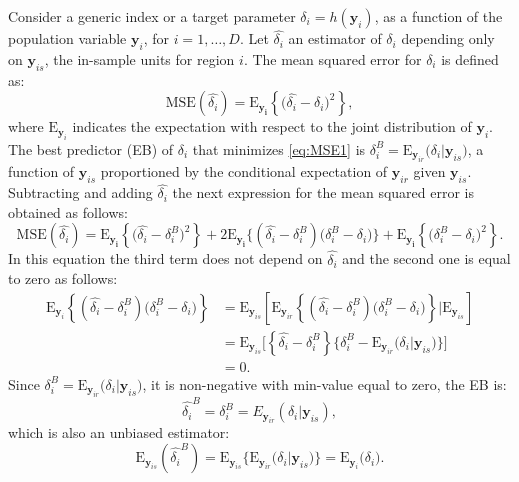 \documentclass[a4paper, 11pt]{article}
\begin{document}
Consider a generic index or a target parameter $\delta_i=h(\mathbf{y}_i)$, as a function of the population variable $\mathbf{y}_i$, for $i=1,\ldots,D$. Let $\hat{\delta_i}$ an estimator of $\delta_i$ depending only on $\mathbf{y}_{is}$, the in-sample units for region $i$. The mean squared error for $\delta_i$ is defined as:
\begin{equation}\label{eq:MSE1}
\text{MSE}\left(\hat{\delta_i}\right)=\text{E}_{\mathbf{y_i}}\left\{\Big(\hat{\delta_i}-\delta_i\Big)^2\right\},
\end{equation}  
where $\text{E}_{\mathbf{y}_i}$ indicates the expectation with respect to the joint distribution of $\mathbf{y}_i$. The best predictor (EB) of $\delta_i$ that minimizes \eqref{eq:MSE1} is $\delta_i^B=\text{E}_{\mathbf{y}_{ir}}\Big(\delta_i|\mathbf{y}_{is}\Big)$, a function of $\mathbf{y}_{is}$ proportioned by the conditional expectation of $\mathbf{y}_{ir}$ given $\mathbf{y}_{is}$. Subtracting and adding $\hat{\delta_i}$ the next expression for the mean squared error is obtained as follows:
\begin{equation*}\label{eq:MSE}
\text{MSE}\left(\hat{\delta_i}\right)=\text{E}_{\mathbf{y_i}}\left\{\Big(\hat{\delta_i}-\delta_i^B\Big)^2\right\}+2\text{E}_{\mathbf{y_i}}\Big\{\left(\hat{\delta_i}-\delta_i^B\right)\Big(\delta_i^B-\delta_i\Big)\Big\}+\text{E}_{\mathbf{y_i}}\left\{\Big(\delta_i^B-\delta_i\Big)^2\right\}.
\end{equation*}
In this equation the third term does not depend on $\hat{\delta_i}$ and the second one is equal to zero as follows:
\begin{align*}
\text{E}_{\mathbf{y}_i}\left\{\left(\hat{\delta_i}-\delta_i^B\right)\Big(\delta_i^B-\delta_i\Big)\right\} &=\text{E}_{\mathbf{y}_{is}}\left[\text{E}_{\mathbf{y}_{ir}}  \left\{\left(\hat{\delta_i}-\delta_i^B\right)\Big(\delta_i^B-\delta_i\Big)\right\}|\text{E}_{\mathbf{y}_{is}}\right]\\
&=\text{E}_{\mathbf{y}_{is}}\Big[\left\{\hat{\delta_i}-\delta_i^B\right\} \Big\{\delta_i^B-\text{E}_{\mathbf{y}_{ir}}\Big(\delta_i|\mathbf{y}_{is}\Big)\Big\}\Big] \\
&=0.
\end{align*} 
Since $\delta_i^B=\text{E}_{\mathbf{y}_{ir}}\Big(\delta_i|\mathbf{y}_{is}\Big)$, it is non-negative with min-value equal to zero, the EB is:
\begin{equation}\label{eg:EXP}
\hat{\delta_i}^B=\delta_i^B=E_{\mathbf{y}_{ir}}(\delta_i|\mathbf{y}_{is}),
\end{equation}
which is also an unbiased estimator:
\begin{equation*}
\text{E}_{\mathbf{y}_{is}}\left(\hat{\delta_i}^B\right)=\text{E}_{\mathbf{y}_{is}}\Big\{\text{E}_{\mathbf{y}_{ir}}\Big(\delta_i|\mathbf{y}_{is}\Big)\Big\}=\text{E}_{\mathbf{y}_{i}}\Big(\delta_i\Big).
\end{equation*}
\end{document}
